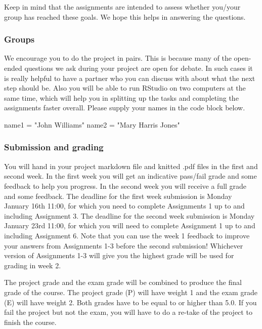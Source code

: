 \documentclass[
]{article}
\newenvironment{Shaded}{\begin{snugshade}}{\end{snugshade}}
\newcommand{\NormalTok}[1]{#1}
\newcommand{\OtherTok}[1]{\textcolor[rgb]{0.56,0.35,0.01}{#1}}
\newcommand{\StringTok}[1]{\textcolor[rgb]{0.31,0.60,0.02}{#1}}
\begin{document}
Keep in mind that the assignments are intended to assess whether
you/your group has reached these goals. We hope this helps in answering
the questions.

\hypertarget{groups}{%
\subsubsection{Groups}\label{groups}}

We encourage you to do the project in pairs. This is because many of the
open-ended questions we ask during your project are open for debate. In
such cases it is really helpful to have a partner who you can discuss
with about what the next step should be. Also you will be able to run
RStudio on two computers at the same time, which will help you in
splitting up the tasks and completing the assignments faster overall.
Please supply your names in the code block below.

\begin{Shaded}
\begin{Highlighting}[]
\NormalTok{name1 }\OtherTok{=} \StringTok{"John Williams"}
\NormalTok{name2 }\OtherTok{=} \StringTok{"Mary Harris Jones"}
\end{Highlighting}
\end{Shaded}

\hypertarget{submission-and-grading}{%
\subsubsection{Submission and grading}\label{submission-and-grading}}

You will hand in your project markdown file and knitted .pdf files in
the first and second week. In the first week you will get an indicative
pass/fail grade and some feedback to help you progress. In the second
week you will receive a full grade and some feedback. The deadline for
the first week submission is Monday January 16th 11:00, for which you
need to complete Assignments 1 up to and including Assignment 3. The
deadline for the second week submission is Monday January 23rd 11:00,
for which you will need to complete Assignment 1 up to and including
Assignment 6. Note that you can use the week 1 feedback to improve your
answers from Assignments 1-3 before the second submission! Whichever
version of Assignments 1-3 will give you the highest grade will be used
for grading in week 2.

The project grade and the exam grade will be combined to produce the
final grade of the course. The project grade (P) will have weight 1 and
the exam grade (E) will have weight 2. Both grades have to be equal to
or higher than 5.0. If you fail the project but not the exam, you will
have to do a re-take of the project to finish the course.
\end{document}
